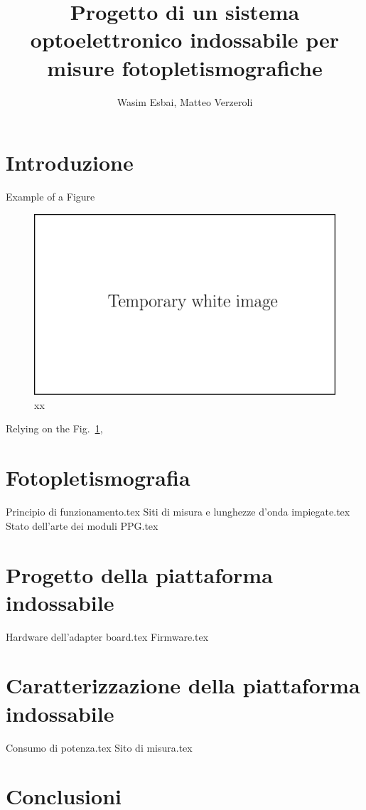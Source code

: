 \documentclass[12pt,a4paper]{book}
\title{Progetto di un sistema optoelettronico indossabile per misure fotopletismografiche}
\author{Wasim Esbai, Matteo Verzeroli}
\newcommand{\Fig}[0]{Fig.}
\begin{document}
	\maketitle
	
	\tableofcontents
	
	\chapter*{Introduzione}
	
	Example of a Figure
	\begin{figure}[h]
		\centering
		\includegraphics[width=0.7\linewidth]{ImageFiles/Fotopletismografia/white_img}
		\caption{xx}
		\label{fig:xx}
	\end{figure}
	
	Relying on the \Fig~\ref{fig:xx},
	
	\chapter{Fotopletismografia}
	{Principio di funzionamento.tex}
	{Siti di misura e lunghezze d’onda impiegate.tex}
	{Stato dell’arte dei moduli PPG.tex}
	
	\chapter{Progetto della piattaforma indossabile}
	{Hardware dell’adapter board.tex}
	{Firmware.tex}
	
	\chapter{Caratterizzazione della piattaforma indossabile}
	{Consumo di potenza.tex}
	{Sito di misura.tex}
	
	\chapter*{Conclusioni}
	
	
	

	
	
\end{document}

